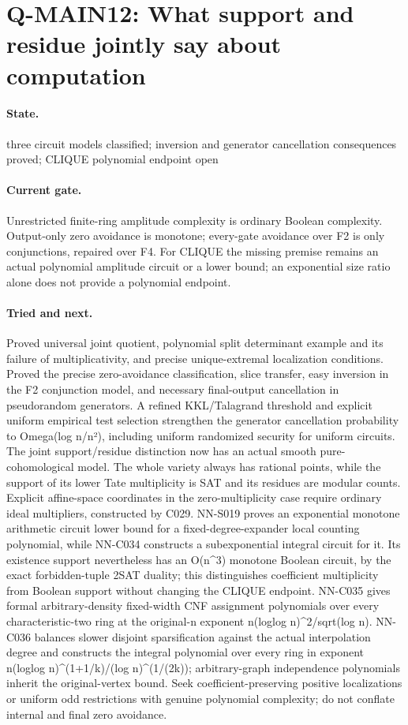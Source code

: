 \section{Q-MAIN12: What support and residue jointly say about computation}
\paragraph{State.} three circuit models classified; inversion and generator cancellation consequences proved; CLIQUE polynomial endpoint open
\paragraph{Current gate.} Unrestricted finite-ring amplitude complexity is ordinary Boolean complexity. Output-only zero avoidance is monotone; every-gate avoidance over F2 is only conjunctions, repaired over F4. For CLIQUE the missing premise remains an actual polynomial amplitude circuit or a lower bound; an exponential size ratio alone does not provide a polynomial endpoint.
\paragraph{Tried and next.} Proved universal joint quotient, polynomial split determinant example and its failure of multiplicativity, and precise unique-extremal localization conditions. Proved the precise zero-avoidance classification, slice transfer, easy inversion in the F2 conjunction model, and necessary final-output cancellation in pseudorandom generators. A refined KKL/Talagrand threshold and explicit uniform empirical test selection strengthen the generator cancellation probability to Omega(log n/n²), including uniform randomized security for uniform circuits. The joint support/residue distinction now has an actual smooth pure-cohomological model. The whole variety always has rational points, while the support of its lower Tate multiplicity is SAT and its residues are modular counts. Explicit affine-space coordinates in the zero-multiplicity case require ordinary ideal multipliers, constructed by C029. NN-S019 proves an exponential monotone arithmetic circuit lower bound for a fixed-degree-expander local counting polynomial, while NN-C034 constructs a subexponential integral circuit for it. Its existence support nevertheless has an O(n\textasciicircum{}3) monotone Boolean circuit, by the exact forbidden-tuple 2SAT duality; this distinguishes coefficient multiplicity from Boolean support without changing the CLIQUE endpoint. NN-C035 gives formal arbitrary-density fixed-width CNF assignment polynomials over every characteristic-two ring at the original-n exponent n(loglog n)\textasciicircum{}2/sqrt(log n). NN-C036 balances slower disjoint sparsification against the actual interpolation degree and constructs the integral polynomial over every ring in exponent n(loglog n)\textasciicircum{}(1+1/k)/(log n)\textasciicircum{}(1/(2k)); arbitrary-graph independence polynomials inherit the original-vertex bound. Seek coefficient-preserving positive localizations or uniform odd restrictions with genuine polynomial complexity; do not conflate internal and final zero avoidance.

